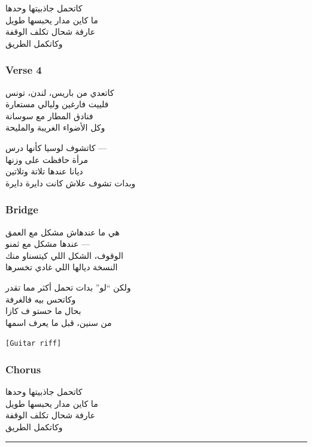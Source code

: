 \documentclass[]{article}
\begin{document}
{\arabicfont كاتحمل جاذبيتها وحدها\\
ما كاين مدار يحبسها طويل\\
عارفة شحال تكلف الوقفة\\
وكاتكمل الطريق}

\subsubsection{Verse 4}\label{verse-4-8}

{\arabicfont كاتعدي من باريس، لندن، تونس\\
فلييت فارغين وليالي مستعارة\\
فنادق المطار مع سوسانة\\
وكل الأضواء الغريبة والمليحة}

{\arabicfont كاتشوف لوسيا كأنها درس ---\\
مرأة حافظت على وزنها\\
ديانا عندها تلاتة وتلاتين\\
وبدات تشوف علاش كانت دايرة دايرة}

\subsubsection{Bridge}\label{bridge-17}

{\arabicfont هي ما عندهاش مشكل مع العمق\\
عندها مشكل مع ثمنو ---\\
الوقوف، الشكل اللي كيتسناو منك\\
النسخة ديالها اللي غادي تخسرها}

{\arabicfont ولكن ``لو'' بدات تحمل أكثر مما تقدر\\
وكاتحس بيه فالغرفة\\
بحال ما حستو ف كازا\\
من سنين، قبل ما يعرف اسمها}

\texttt{{[}Guitar\ riff{]}}

\subsubsection{Chorus}\label{chorus-69}

{\arabicfont كاتحمل جاذبيتها وحدها\\
ما كاين مدار يحبسها طويل\\
عارفة شحال تكلف الوقفة\\
وكاتكمل الطريق}

\begin{center}\rule{0.5\linewidth}{0.5pt}\end{center}
\end{document}
